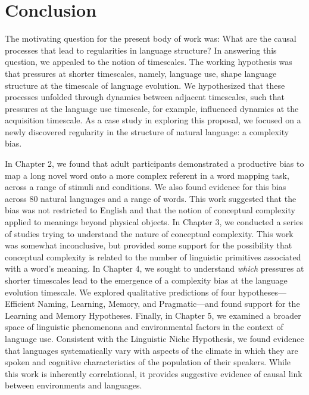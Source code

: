 
\chapter{Conclusion}
\label{chapter:conclusion}
The motivating question for the present body of work was: What are the causal processes that lead to regularities in language structure?   In answering this question, we appealed to the notion of timescales. The working hypothesis was that pressures at shorter timescales, namely, language use, shape language structure at the timescale of language evolution. We hypothesized that these processes unfolded through dynamics between adjacent timescales, such that pressures at the language use timescale, for example, influenced dynamics at the acquisition timescale.  As a case study in exploring this proposal, we focused on a newly discovered regularity in the structure of natural language: a complexity bias.

In Chapter 2, we found that adult participants demonstrated a productive bias to map a long novel word onto a more complex referent in a word mapping task, across a range of stimuli and conditions. We  also found evidence for this bias across 80 natural languages and a range of words. This work suggested that  the bias was not restricted to English and that the notion of conceptual complexity applied to meanings beyond physical objects. In Chapter 3, we conducted a series of studies trying to understand the nature of conceptual complexity. This work was somewhat inconclusive, but provided some support for the possibility that conceptual complexity is related to the number of linguistic primitives associated with a word's meaning. In Chapter 4, we sought to understand {\it which} pressures at shorter timescales lead to the emergence of a complexity bias at the language evolution timescale. We explored qualitative predictions of four hypotheses---Efficient Naming, Learning, Memory, and Pragmatic---and found support for the Learning and Memory Hypotheses. Finally, in Chapter 5, we examined a broader space of linguistic phenomenona and environmental factors in the context of language use. Consistent with the Linguistic Niche Hypothesis, we found evidence that languages systematically vary with aspects of the climate in which they are spoken and cognitive characteristics of the population of their speakers. While this work is inherently correlational, it provides suggestive evidence of causal link between environments and languages.

